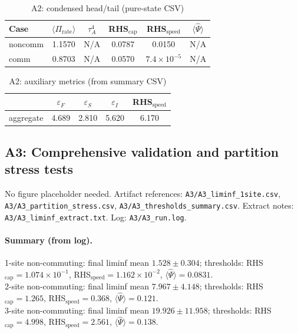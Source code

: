 \documentclass[10pt]{article}
\begin{document}
\begin{table}[!ht]
\centering
\caption{A2: condensed head/tail (pure-state CSV)}
\label{tab:a2-condensed}
\begin{tabular}{@{}lccccc@{}}
\toprule
Case & $\langle\Pi_{\mathrm{rate}}\rangle$ & $\tau_A^4$ & RHS$_{\mathrm{cap}}$ & RHS$_{\mathrm{speed}}$ & $\langle\widehat{\Psi}\rangle$ \\
\midrule
noncomm & 1.1570 & N/A & 0.0787 & 0.0150 & N/A \\
comm    & 0.8703 & N/A & 0.0570 & $7.4\times10^{-5}$ & N/A \\
\bottomrule
\end{tabular}
\end{table}

\begin{table}[!ht]
\centering
\caption{A2: auxiliary metrics (from summary CSV)}
\label{tab:a2-aux}
\begin{tabular}{@{}lcccc@{}}
\toprule
 & $\varepsilon_F$ & $\varepsilon_S$ & $\varepsilon_I$ & RHS$_{\mathrm{speed}}$ \\
\midrule
aggregate & 4.689 & 2.810 & 5.620 & 6.170 \\
\bottomrule
\end{tabular}
\end{table}


\subsection{A3: Comprehensive validation and partition stress tests}\label{app:a3}
No figure placeholder needed. Artifact references: \texttt{A3/A3\_liminf\_1site.csv}, \texttt{A3/A3\_partition\_stress.csv}, \texttt{A3/A3\_thresholds\_summary.csv}. Extract notes: \texttt{A3/A3\_liminf\_extract.txt}. Log: \texttt{A3/A3\_run.log}.

\paragraph{Summary (from log).}
1-site non-commuting: final liminf mean $1.528\pm0.304$; thresholds: RHS$_{\mathrm{cap}}=1.074\times10^{-1}$, RHS$_{\mathrm{speed}}=1.162\times10^{-2}$, $\langle\widehat{\Psi}\rangle=0.0831$.\\
2-site non-commuting: final liminf mean $7.967\pm4.148$; thresholds: RHS$_{\mathrm{cap}}=1.265$, RHS$_{\mathrm{speed}}=0.368$, $\langle\widehat{\Psi}\rangle=0.121$.\\
3-site non-commuting: final liminf mean $19.926\pm11.958$; thresholds: RHS$_{\mathrm{cap}}=4.998$, RHS$_{\mathrm{speed}}=2.561$, $\langle\widehat{\Psi}\rangle=0.138$.
\end{document}
